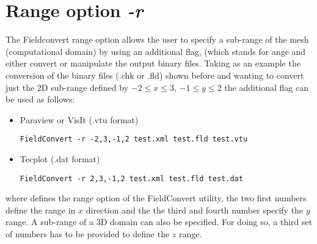 \section{Range option \textit{-r}}
The Fieldconvert range option  allows the user to specify 
a sub-range of the mesh (computational domain) by using an 
additional flag,  (which stands for ange and either 
convert or manipulate the \nekpp output binary files. 
Taking as an example the conversion of the \nekpp binary files 
(.chk or .fld) shown before and wanting to convert just the 2D 
sub-range defined by $-2\leq x \leq 3$, $-1\leq y \leq 2$ the 
additional flag  can be used as follows:
%
\begin{itemize}
\item Paraview or VisIt (.vtu format)
%
\begin{lstlisting}[style=BashInputStyle]
FieldConvert -r -2,3,-1,2 test.xml test.fld test.vtu
\end{lstlisting}
%
\item Tecplot (.dat format)
%
\begin{lstlisting}[style=BashInputStyle]
FieldConvert -r 2,3,-1,2 test.xml test.fld test.dat
\end{lstlisting}
%
\end{itemize}
where  defines the range option of the FieldConvert
utility, the two first numbers define the range in $x$ direction 
and the the third and fourth number specify the $y$ range.
A sub-range of a 3D domain can also be specified. 
For doing so, a third set of numbers has to be provided 
to define the $z$ range.
%
%
%
